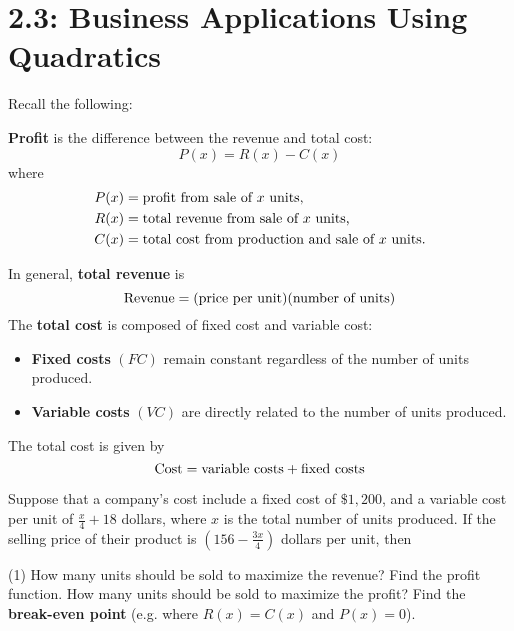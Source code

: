 \documentclass[../mathNotesPreamble]{subfiles}
\begin{document}
  \section{2.3: Business Applications Using Quadratics}
  Recall the following:
  \begin{defn*}
    \textbf{Profit} is the difference between the revenue and total cost:
      \[P(x)=R(x)-C(x)\]
    where
      \begin{align*}
        P(x)&= \textnormal{profit from sale of $x$ units,}\\
        R(x)&= \textnormal{total revenue from sale of $x$ units,}\\
        C(x)&= \textnormal{total cost from production and sale of $x$ units.}
      \end{align*}

    \vspace*{\baselineskip}
    In general, \textbf{total revenue} is
      \[\textnormal{Revenue}={\left(\textnormal{price per unit}\right)}{\left(\textnormal{number of units}\right)}\]
    The \textbf{total cost} is composed of fixed cost and variable cost:
    \begin{itemize}
      \item \textbf{Fixed costs} $(FC)$ remain constant regardless of the number of units produced.
      \item \textbf{Variable costs} $(VC)$ are directly related to the number of units produced.
    \end{itemize}
    The total cost is given by
      \[\textnormal{Cost}=\textnormal{variable costs}+\textnormal{fixed costs}\]
  \end{defn*}
  \pagebreak

  \begin{ex*}
    Suppose that a company's cost include a fixed cost of $\$1,200$, and a variable cost per unit of $\frac{x}{4}+18$ dollars, where $x$ is the total number of units produced. If the selling price of their product is $(156-\frac{3x}{4})$ dollars per unit, then
  \end{ex*}
  \begin{extasks}[after-item-skip=\stretch{1}](1)
    \task How many units should be sold to maximize the revenue?
    \task Find the profit function.
    \task How many units should be sold to maximize the profit?
    \task Find the \textbf{break-even point} (e.g. where $R(x)=C(x)$ and $P(x)=0$).
  \end{extasks}
\end{document}
